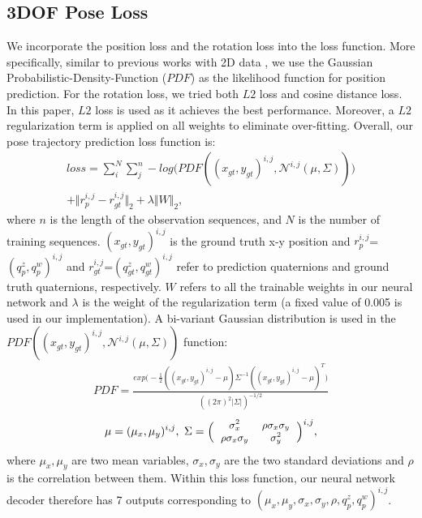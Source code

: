 \documentclass[letterpaper, 10 pt, conference]{ieeeconf}  %
\begin{document}
\subsection{3DOF Pose Loss}
We incorporate the position loss and the rotation loss into the loss function. More specifically, similar to previous works with 2D data \cite{social-lstm}, we use the Gaussian Probabilistic-Density-Function ($PDF$) as the likelihood function for position prediction. For the rotation loss, we tried both $L2$ loss and cosine distance loss. In this paper, $L2$ loss is used as it achieves the best performance. Moreover, a $L2$ regularization term is applied on all weights to eliminate over-fitting. Overall, our pose trajectory prediction loss function is:
\begin{equation}
\begin{split}
loss = \sum_i^N \sum_j^{n} -log \big ( PDF((x_{gt}, y_{gt})^{i,j},\mathcal{N}^{i,j}(\mu, \Sigma))  \big )\\
+ \Vert r_p^{i,j}-r_{gt}^{i,j}\Vert_2 + \lambda \Vert W \Vert_2, ~~~~~~~~~
\end{split}
\end{equation}
\noindent where $n$ is the length of the observation sequences, and $N$ is the number of training sequences. $(x_{gt}, y_{gt})^{i,j}$ is the ground truth x-y position and $r_p^{i,j}$=$(q_p^z, q_p^w)^{i,j}$ and $r_{gt}^{i,j}$=$(q_{gt}^z, q_{gt}^w)^{i,j}$ refer to prediction quaternions and ground truth quaternions, respectively. $W$ refers to all the trainable weights in our neural network and $\lambda$ is the weight of the regularization term (a fixed value of 0.005 is used in our implementation). A bi-variant Gaussian distribution is used in the $PDF((x_{gt}, y_{gt})^{i,j},\mathcal{N}^{i,j}(\mu, \Sigma))$ function:
\begin{equation}
\begin{split}
PDF=
\frac{exp \big (-\frac{1}{2}((x_{gt}, y_{gt})^{i,j}-\mu) \Sigma^{-1} ((x_{gt}, y_{gt})^{i,j}-\mu)^T \big )} {((2 \pi)^2|\Sigma|)^{-1/2}}
\end{split}
\end{equation}
\begin{equation}
\small
\mu = ( \mu_x, \mu_y )^{i,j}
, 
~ \Sigma = \Big( 
\begin{tabular}{cc} 
  $\sigma_x^2$ & $\rho \sigma_x \sigma_y$ \\
  $\rho \sigma_x \sigma_y$ & $\sigma_y^2$
\end{tabular}
\Big)^{i,j},
\end{equation}
\noindent where $\mu_x, \mu_y$ are two mean variables, $\sigma_x, \sigma_y$ are the two standard deviations and $\rho$ is the correlation between them. Within this loss function, our neural network decoder therefore has 7 outputs corresponding to $(\mu_x, \mu_y, \sigma_x, \sigma_y, \rho, q_p^z, q_p^w)^{i,j}$.
\end{document}
